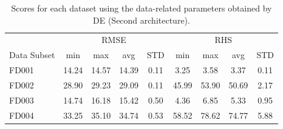 \documentclass[12pt]{IEEEtran}%
\begin{document}
\begin{table}
\begin{center}
\caption
{Scores for each dataset using the data-related parameters obtained by DE (Second architecture).}%
%

\begin{tabular}
[c]{l|cccc|cccc}\hline
& \multicolumn{4}{|c}{RMSE} & \multicolumn{4}{|c}{RHS}\\
Data Subset & min & max & avg & STD & min & max & avg & STD\\\hline\hline
FD001 & 14.24 & 14.57 & 14.39 & 0.11 & 3.25 & 3.58 & 3.37 & 0.11\\
FD002 & 28.90 & 29.23 & 29.09 & 0.11 & 45.99 & 53.90 & 50.69 & 2.17\\
FD003 & 14.74 & 16.18 & 15.42 & 0.50 & 4.36 & 6.85 & 5.33 & 0.95\\
FD004 & 33.25 & 35.10 & 34.74 & 0.53 & 58.52 & 78.62 & 74.77 & 5.88\\\hline
\end{tabular}
\label{table:results_ann_de}%

\end{center}
\end{table}%
%

%
\end{document}
